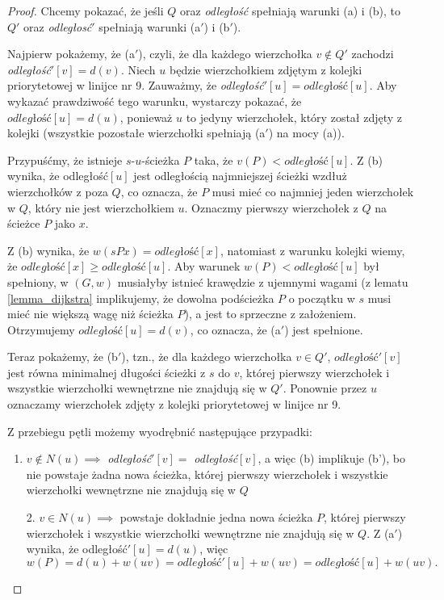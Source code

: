 \begin{theorem}
\begin{proof}
		Chcemy pokazać, że jeśli $Q$ oraz \textit{odległość} spełniają
		warunki (a) i (b), to $Q'$ oraz \textit{odległosć}$'$ 
		spełniają warunki (a$'$) i (b$'$).
		
		Najpierw pokażemy, że (a$'$), czyli, że
		dla każdego wierzchołka $v \not \in Q'$ zachodzi
		\textit{odległość}$'[v] = d(v)$. Niech $u$ będzie wierzchołkiem
		zdjętym z kolejki priorytetowej w linijce nr 9.
		Zauważmy, że \textit{odległość}$'[u] = \textit{odległość}[u]$. 
		Aby wykazać prawdziwość tego warunku, wystarczy
		pokazać, że $\textit{odległość}[u] = d(u)$, ponieważ
		$u$ to jedyny wierzchołek, który został zdjęty z kolejki
		(wszystkie pozostałe wierzchołki spełniają 
		(a$'$) na mocy (a)).
		
		Przypuśćmy, że istnieje 
		$s$-$u$-ścieżka $P$ taka, że $v(P) < \textit{odległość}[u]$. 
		Z (b) wynika, że odległość$[u]$ jest odległością 
		najmniejszej ścieżki wzdłuż wierzchołków z poza $Q$, co
		oznacza, że $P$ musi mieć co najmniej jeden wierzchołek 
		w $Q$, który nie jest wierzchołkiem $u$. 
		Oznaczmy pierwszy wierzchołek z $Q$ na ścieżce $P$ jako $x$. 
		
		Z (b) wynika, że $w(sPx) = \textit{odległość}[x]$, natomiast
		z warunku kolejki wiemy, że
		$\textit{odległość}[x] \geq \textit{odległość}[u]$. Aby 
		warunek $w(P) < \textit{odległość}[u]$ był spełniony,
		w $(G, w)$ musiałyby istnieć krawędzie 
		z ujemnymi wagami (z lematu \ref{lemma_dijkstra} implikujemy, że
		dowolna podścieżka $P$ o początku w $s$
		musi mieć nie większą wagę niż ścieżka $P$), a jest to sprzeczne z założeniem. Otrzymujemy
		$\textit{odległość}[u] = d(v)$,
		co oznacza, że (a$'$) jest spełnione.
		
		Teraz pokażemy, że (b$'$), tzn., że
		dla każdego wierzchołka $v \in Q'$, 
		$\textit{odległość}'[v]$ jest równa minimalnej długości
		ścieżki z $s$ do $v$, której pierwszy wierzchołek i 
		wszystkie wierzchołki wewnętrzne 
		nie znajdują się w $Q'$. Ponownie 
		przez $u$ oznaczamy wierzchołek
		zdjęty z kolejki priorytetowej w linijce nr 9.
		
		Z przebiegu pętli możemy wyodrębnić następujące 
		przypadki: 
		\begin{enumerate}
			\item $v \not \in N(u) \implies$ 
			\textit{odległość}$'[v]=$ \textit{odległość}$[v]$, a więc (b) 
			implikuje (b'), bo nie powstaje żadna nowa ścieżka, 
			której pierwszy wierzchołek i wszystkie wierzchołki
			wewnętrzne nie znajdują się w $Q$
			\item[2.] $v \in N(u) \implies$ 
			powstaje dokładnie jedna nowa ścieżka $P$, 
			której pierwszy wierzchołek i wszystkie wierzchołki
			wewnętrzne nie znajdują się w $Q$. Z (a$'$) wynika, że
			odległość$'[u] = d(u)$, więc 
			\[w(P) = d(u) + w(uv) = \textit{odległość}'[u] + w(uv) = \textit{odległość}[u] + w(uv).\]
			

\end{enumerate}
\end{proof}
\end{theorem}
